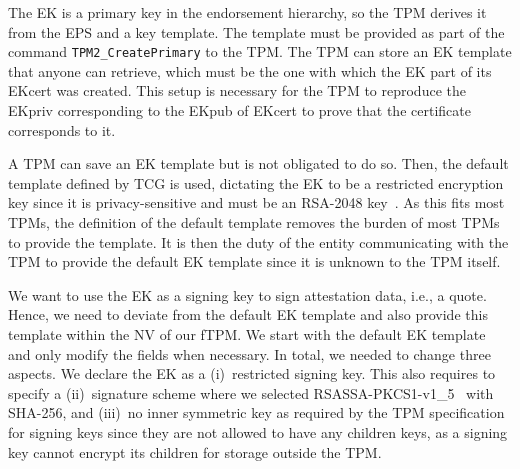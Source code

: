 The EK is a primary key in the endorsement hierarchy, so the TPM derives it from the EPS and a key template.
The template must be provided as part of the command \texttt{TPM2\_CreatePrimary} to the TPM\@.
The TPM can store an EK template that anyone can retrieve, which must be the one with which the EK part of its EKcert was created.
This setup is necessary for the TPM to reproduce the EKpriv corresponding to the EKpub of EKcert to prove that the certificate corresponds to it.

A TPM can save an EK template but is not obligated to do so.
Then, the default template defined by TCG is used, dictating the \ac{EK} to be a restricted encryption key since it is privacy-sensitive and must be an RSA-2048 key~\cite{tcg-ek}.
As this fits most \acp{TPM}, the definition of the default template removes the burden of most TPMs to provide the template.
It is then the duty of the entity communicating with the TPM to provide the default EK template since it is unknown to the TPM itself.



We want to use the EK as a signing key to sign attestation data, i.e., a quote.
Hence, we need to deviate from the default EK template and also provide this template within the NV of our fTPM\@.
We start with the default EK template and only modify the fields when necessary.
In total, we needed to change three aspects.
We declare the EK as a (i)~restricted signing key.
This also requires to specify a (ii)~signature scheme where we selected RSASSA-PKCS1-v1\_5~\cite{Jonsson2003} with SHA-256, and (iii)~no inner symmetric key as required by the TPM specification~\cite{tpm20} for signing keys since they are not allowed to have any children keys, as a signing key cannot encrypt its children for storage outside the TPM\@.


